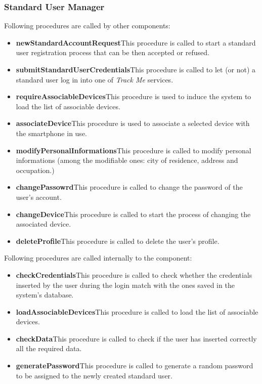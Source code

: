 \subsubsection{Standard User Manager}
Following procedures are called by other components:
\begin{itemize}
  \item \textbf{newStandardAccountRequest}\quad This procedure is called to start a standard user registration process that can be then accepted or refused.
  \item \textbf{submitStandardUserCredentials}\quad This procedure is called to let (or not) a standard user log in into one of \textit{Track Me} services.
  \item \textbf{requireAssociableDevices}\quad This procedure is used to induce the system to load the list of associable devices.
  \item \textbf{associateDevice}\quad This procedure is used to associate a selected device with the smartphone in use.
  \item \textbf{modifyPersonalInformations}\quad This procedure is called to modify personal informations (among the modifiable ones:  city of residence, address and occupation.)
  \item \textbf{changePassowrd}\quad This procedure is called to change the password of the user's account.
  \item \textbf{changeDevice}\quad This procedure is called to start the process of changing the associated device.
  \item \textbf{deleteProfile}\quad This procedure is called to delete the user's profile.
\end{itemize}

\myparagraph{}
Following procedures are called internally to the component:
\begin{itemize}
  \item \textbf{checkCredentials}\quad This procedure is called to check whether the credentials inserted by the user during the login match with the ones saved in the system's database.
  \item \textbf{loadAssociableDevices}\quad This procedure is called to load the list of associable devices.
  \item \textbf{checkData}\quad This procedure is called to check if the user has inserted correctly all the required data.
  \item \textbf{generatePassword}\quad This procedure is called to generate a random password to be assigned to the newly created standard user.
\end{itemize}

